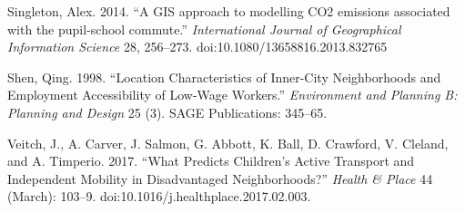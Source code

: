 \documentclass[3p,authoryear,preprint,review,12pt]{elsarticle}
\begin{document}
Singleton, Alex. 2014. ``A GIS approach to modelling CO2 emissions associated with the pupil-school commute.'' \emph{International Journal of Geographical Information Science} 28, 256–273. doi:10.1080/13658816.2013.832765

Shen, Qing. 1998. ``Location Characteristics of Inner-City Neighborhoods
and Employment Accessibility of Low-Wage Workers.'' \emph{Environment
and Planning B: Planning and Design} 25 (3). SAGE Publications: 345--65.

Veitch, J., A. Carver, J. Salmon, G. Abbott, K. Ball, D. Crawford, V. Cleland, and A. Timperio. 2017. ``What Predicts Children’s Active Transport and Independent Mobility in Disadvantaged Neighborhoods?'' \emph{Health \& Place} 44 (March): 103–9. doi:10.1016/j.healthplace.2017.02.003.
\end{document}
